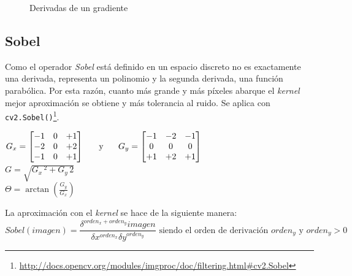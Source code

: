 \begin{figure}[H]
  \caption{Derivadas de un gradiente}
  \centering \setlength\fboxsep{0pt} \setlength\fboxrule{0.5pt}
\end{figure}

\subsection{Sobel}
Como el operador \emph{Sobel} \emph{\citep*[History and definition of
  the sobel operator]{sobel2014history}} está definido en un espacio
discreto no es exactamente una derivada, representa un polinomio y la
segunda derivada, una función parabólica. Por esta razón, cuanto más
grande y más píxeles abarque el \emph{kernel} mejor aproximación se
obtiene y más tolerancia al ruido. Se aplica con
\texttt{cv2.Sobel()}\footnote{\url{http://docs.opencv.org/modules/imgproc/doc/filtering.html\#cv2.Sobel}}.
\begin{center}
  $ G_x = \begin{bmatrix}
    -1 & 0 & +1 \\
    -2 & 0 & +2 \\
    -1 & 0 & +1 \\
  \end{bmatrix}
  \hspace{0.5cm} \text{ y } \hspace{0.5cm} G_y = \begin{bmatrix}
    -1 & -2 & -1 \\
    0 & 0 & 0 \\
    +1 & +2 & +1 \\
  \end{bmatrix}
  $
  \\[0.5cm]
  $G = \sqrt{G_x\,^2 + G_y\,{2}}$
  \\[0.5cm]
  $\Theta= \arctan\left(\frac{G_y}{G_x} \right)$
\end{center}
La aproximación con el \emph{kernel} se hace de la siguiente manera:
\begin{equation*}
  Sobel(imagen) = \frac{\delta^{orden_x + orden_y} imagen}{\delta x^{orden_x} \delta
    y^{orden_y}} \text{ siendo el orden de derivación } orden_y \text{ y } orden_y > 0
\end{equation*}


